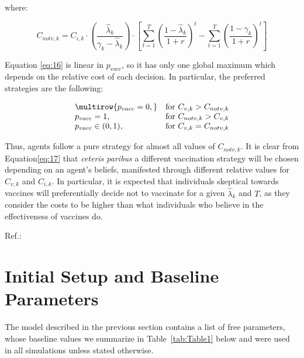 \documentclass[11pt]{article}
\begin{document}
where: 

\begin{equation}\label{eq:16}
	C_{notv,k}=C_{i,k} \cdot \left( \frac{\hat{\lambda}_{k}}{\gamma_{k}-\hat{\lambda}_{k}} \right) \cdot \left[\sum_{t = 1}^{T} \left(\frac{1-\hat{\lambda}_{k}}{1+r}\right)^t - \sum_{t = 1}^{T}\left(\frac{1-\gamma_k}{1+r}\right)^t\right]
\end{equation}

Equation \eqref{eq:16} is linear in \(p_{vacc}\), so it has only one global maximum which depends on the relative cost of each decision. In particular, the preferred strategies are the following:

\begin{equation}\label{eq:17}
	\begin{array}
	{@{}lr@{}}
        \multirow{p_{vacc}=0,} & \text{for }C_{v,k}>C_{notv,k} \\
        {p_{vacc}=1,} & \text{for }C_{notv,k}>C_{v,k} \\
        {p_{vacc}\in(0,1),} & \text{for }C_{v,k}=C_{notv,k} \\
    \end{array}
\end{equation}

Thus, agents follow a pure strategy for almost all values of \(C_{notv,k}\). It is clear from Equation\eqref{eq:17} that \textit{ceteris paribus} a different vaccination strategy will be chosen depending on an agent's beliefs, manifested through different relative values for \(C_{v,k}\) and \(C_{i,k}\). In particular, it is expected that individuals skeptical towards vaccines will preferentially decide not to vaccinate for a given \(\hat{\lambda}_{k}\) and \(T\), as they consider the costs to be higher than what individuals who believe in the effectiveness of vaccines do.

Ref.:
\cite{shim2012}

\section{Initial Setup and Baseline Parameters}

The model described in the previous section contains a list of free parameters, whose baseline values we summarize in Table~\ref{tab:Table1} below and were used in all simulations unless stated otherwise.
\end{document}
